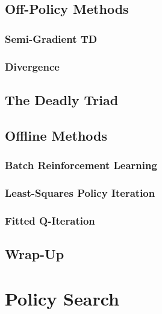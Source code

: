 	\section{Off-Policy Methods} %

		\subsection{Semi-Gradient TD} %

		\subsection{Divergence} %

	\section{The Deadly Triad} %

	\section{Offline Methods} %

		\subsection{Batch Reinforcement Learning} %

		\subsection{Least-Squares Policy Iteration} %

		\subsection{Fitted Q-Iteration} %

	\section{Wrap-Up} %

\chapter{Policy Search} %

